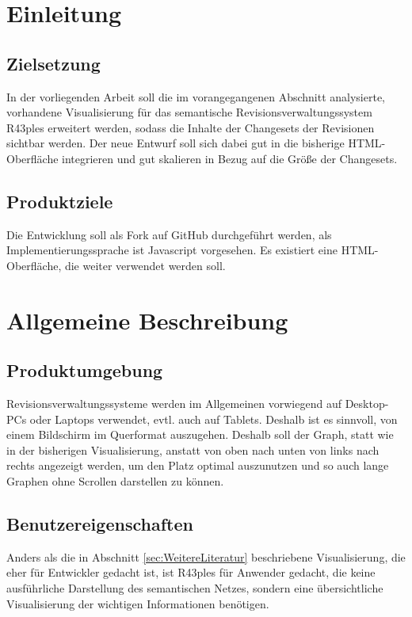 \documentclass[color]{tudbook}
\begin{document}
\section{Einleitung}
\subsection{Zielsetzung}
In der vorliegenden Arbeit soll die im vorangegangenen Abschnitt analysierte, vorhandene Visualisierung für das semantische Revisionsverwaltungssystem R43ples erweitert werden, sodass die Inhalte der Changesets der Revisionen sichtbar werden. Der neue Entwurf soll sich dabei gut in die bisherige HTML-Oberfläche integrieren und gut skalieren in Bezug auf die Größe der Changesets.

\subsection{Produktziele}
Die Entwicklung soll als Fork auf GitHub durchgeführt werden, als Implementierungssprache ist Javascript vorgesehen. Es existiert eine HTML-Oberfläche, die weiter verwendet werden soll.

\section{Allgemeine Beschreibung}
\subsection{Produktumgebung}
Revisionsverwaltungssysteme werden im Allgemeinen vorwiegend auf Desktop-PCs oder Laptops verwendet, evtl. auch auf Tablets. Deshalb ist es sinnvoll, von einem Bildschirm im Querformat auszugehen. Deshalb soll der Graph, statt wie in der bisherigen Visualisierung, anstatt von oben nach unten von links nach rechts angezeigt werden, um den Platz optimal auszunutzen und so auch lange Graphen ohne Scrollen darstellen zu können.

\subsection{Benutzereigenschaften}
Anders als die in Abschnitt \ref{sec:WeitereLiteratur} beschriebene Visualisierung, die eher für Entwickler gedacht ist, ist R43ples für Anwender gedacht, die keine ausführliche Darstellung des semantischen Netzes, sondern eine übersichtliche Visualisierung der wichtigen Informationen benötigen. 
\end{document}
